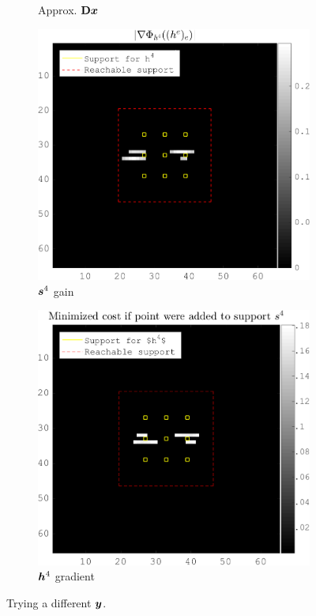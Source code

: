 \begin{figure}[!ht]
\begin{subfigure}[b]{0.22\textwidth}
	\caption{Approx. $\mathbf{D}\bm{x}$}
	\end{subfigure}
	\begin{subfigure}[b]{0.26\textwidth}\centering
	\includegraphics[width=\textwidth]{figures/xp/tilted_n4/xp_128x128_sc2_angl4_K3_S3_node4_partgrad4_bestvalues.png}
	\caption{$\bm{s}^4$ gain}
	\end{subfigure}
	\begin{subfigure}[b]{0.26\textwidth}\centering
	\includegraphics[width=\textwidth]{figures/xp/tilted_n4/xp_128x128_sc2_angl4_K3_S3_node4_objmatrix_bestvalues.png}
	\caption{$\bm{h}^4$ gradient}
	\end{subfigure}
\caption{Trying a different $\bm{y}$.}\label{fig_gain_tilted_n4}
\end{figure}


